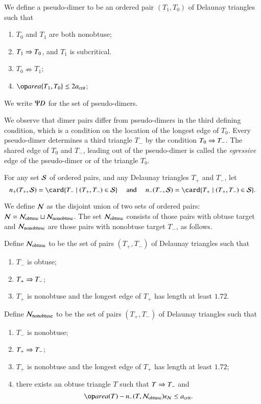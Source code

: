 \begin{definition}
  We define a pseudo-dimer to be an ordered pair $(T_1,T_0)$ of
  Delaunay triangles such that
\begin{enumerate}
\item $T_0$ and $T_1$ are both nonobtuse;
\item $T_1\Ra T_0$, and  $T_1$ is subcritical.
\item $T_0 \nRightarrow T_1$;
\item $\area\{T_1,T_0\} \le 2\acrit$;
\end{enumerate}
We write $\PD$ for the set of pseudo-dimers.
\end{definition}

We observe that dimer pairs differ from pseudo-dimers in the third
defining condition, which is a condition on the location of the
longest edge of $T_0$.  Every pseudo-dimer determines a third triangle
$T_-$ by the condition $T_0\Ra T_-$.  The shared edge of $T_0$ and
$T_-$, leading out of the pseudo-dimer is called the {\it egressive} edge of
the pseudo-dimer or of the triangle $T_0$.

For any set $\S$ of ordered pairs, and any Delaunay triangles $T_+$
and $T_-$, let
\[
n_+(T_+,\S) = \card \{T_-\mid (T_+,T_-)\in \S\}
\quad\text{ and }\quad
n_-(T_-,\S)
= \card \{T_+\mid (T_+,T_-)\in \S\}.
\]

We define $\N$ as the disjoint union of two sets of ordered pairs: $\N
= \N_{\text{obtuse}} \sqcup \N_{\text{nonobtuse}}$.  The set
$\N_{\text{obtuse}}$ consists of those pairs with obtuse target and
$\N_{\text{nonobtuse}}$ are those pairs with nonobtuse target $T_-$,
as follows.

Define $\N_{\text{obtuse}}$ to be the set of pairs $(T_+,T_-)$ of
Delaunay triangles such that
\begin{enumerate}
\item $T_-$ is obtuse;
\item $T_+\Ra T_-$;
\item $T_+$ is nonobtuse and the longest edge of $T_+$ has length at
  least $1.72$.
\end{enumerate}

Define  $\N_{\text{nonobtuse}}$ to 
be the set of pairs $(T_+,T_-)$ of Delaunay triangles such that
\begin{enumerate}
\item $T_-$ is nonobtuse;
\item $T_+\Ra T_-$;
\item $T_+$ is nonobtuse and the longest edge of $T_+$ has length at
  least $1.72$;
\item there exists an obtuse triangle $T$ such that $T\Ra T_-$ and 
\[
\area(T) -   n_-(T,\N_{\text{obtuse}})\epsN\le \acrit.
\]
\end{enumerate}

